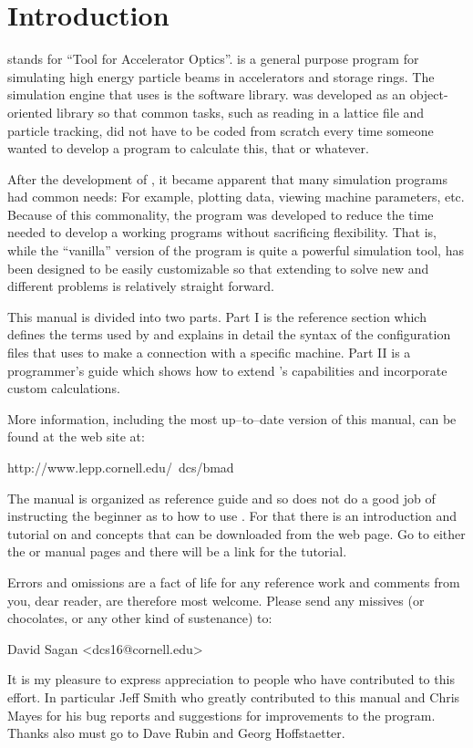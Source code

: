 \section*{Introduction}
\label{c:introduction}

\tao stands for ``Tool for Accelerator Optics''. \tao is a general purpose program for simulating
high energy particle beams in accelerators and storage rings. The simulation engine that \tao uses
is the \bmad software library\cite{b:bmad}. \bmad was developed as an object-oriented library so
that common tasks, such as reading in a lattice file and particle tracking, did not have to be coded
from scratch every time someone wanted to develop a program to calculate this, that or whatever.

After the development of \bmad, it became apparent that many simulation programs had common needs:
For example, plotting data, viewing machine parameters, etc. Because of this commonality, the \tao
program was developed to reduce the time needed to develop a working programs without sacrificing
flexibility. That is, while the ``vanilla'' version of the \tao program is quite a powerful
simulation tool, \tao has been designed to be easily customizable so that extending \tao to solve
new and different problems is relatively straight forward.

This manual is divided into two parts. Part I is the reference section which defines the terms used
by \tao and explains in detail the syntax of the configuration files that \tao uses to make a
connection with a specific machine. Part II is a programmer's guide which shows how to extend
\tao's capabilities and incorporate custom calculations.

More information, including the most up--to--date version of this
manual, can be found at the \bmad web site at:
\begin{example}
  http://www.lepp.cornell.edu/~dcs/bmad
\end{example}

\vspace{0.1in}
The \tao manual is organized as reference guide and so does not do a good job of instructing the
beginner as to how to use \tao. For that there is an introduction and tutorial on \bmad and \tao
concepts that can be downloaded from the \bmad web page. Go to either the \bmad or \tao manual pages
and there will be a link for the tutorial.

Errors and omissions are a fact of life for any reference work and comments from you, dear reader,
are therefore most welcome. Please send any missives (or chocolates, or any other kind of
sustenance) to:
\begin{example}
  David Sagan <dcs16@cornell.edu>
\end{example}

It is my pleasure to express appreciation to people who have contributed to this effort. In
particular Jeff Smith who greatly contributed to this manual and Chris Mayes for his bug reports and
suggestions for improvements to the program. Thanks also must go to Dave Rubin and Georg
Hoffstaetter.

